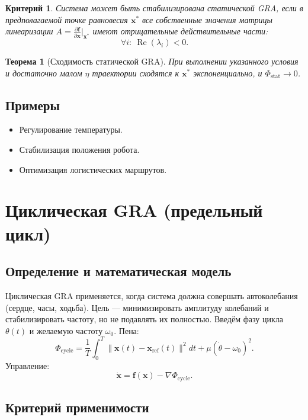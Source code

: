 \documentclass[12pt,a4paper]{article}
\newtheorem{theorem}{Теорема}
\newtheorem{criteria}{Критерий}
\begin{document}
\begin{criteria}
Система может быть стабилизирована статической GRA, если в предполагаемой точке равновесия \(\mathbf{x}^*\) все собственные значения матрицы линеаризации \(A = \frac{\partial \mathbf{f}}{\partial \mathbf{x}}\big|_{\mathbf{x}^*}\) имеют отрицательные действительные части:
\[
\forall i:\ \operatorname{Re}(\lambda_i) < 0.
\]
\end{criteria}

\begin{theorem}[Сходимость статической GRA]
При выполнении указанного условия и достаточно малом \(\eta\) траектории сходятся к \(\mathbf{x}^*\) экспоненциально, и \(\Phi_{\text{stat}} \to 0\).
\end{theorem}

\subsection{Примеры}
\begin{itemize}
    \item Регулирование температуры.
    \item Стабилизация положения робота.
    \item Оптимизация логистических маршрутов.
\end{itemize}

\section{Циклическая GRA (предельный цикл)}

\subsection{Определение и математическая модель}

Циклическая GRA применяется, когда система должна совершать автоколебания (сердце, часы, ходьба). Цель — минимизировать амплитуду колебаний и стабилизировать частоту, но не подавлять их полностью. Введём фазу цикла \(\theta(t)\) и желаемую частоту \(\omega_0\). Пена:
\[
\Phi_{\text{cycle}} = \frac{1}{T}\int_0^T \|\mathbf{x}(t) - \mathbf{x}_{\text{ref}}(t)\|^2 dt + \mu (\dot{\theta} - \omega_0)^2.
\]
Управление:
\[
\dot{\mathbf{x}} = \mathbf{f}(\mathbf{x}) - \nabla \Phi_{\text{cycle}}.
\]

\subsection{Критерий применимости}
\end{document}
